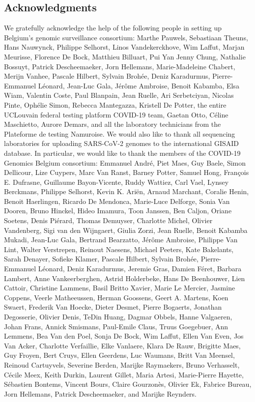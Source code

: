 \subsection*{Acknowledgments}
We gratefully acknowledge the help of the following people in setting up Belgium's genomic surveillance consortium: Marthe Pauwels, Sebastiaan Theuns, Hans Nauwynck, Philippe Selhorst, Linos Vandekerckhove, Wim Laffut, Marjan Meurisse, Florence De Bock, Matthieu Billuart, Pui Yan Jenny Chung, Nathalie Bossuyt, Patrick Descheemaeker, Jorn Hellemans, Marie-Madeleine Chabert, Merijn Vanhee, Pascale Hilbert, Sylvain Broh\'{e}e, Deniz Karadurmus, Pierre-Emmanuel L\'{e}onard, Jean-Luc Gala, J\'{e}r\^{o}me Ambroise, Benoit Kabamba, Elsa Wiam, Valentin Coste, Paul Blanpain, Jean Ruelle, Ari Serbetciyan, Nicolas Pinte, Oph\'{e}lie Simon, Rebecca Mantegazza, Kristell De Potter, the entire UCLouvain federal testing platform COVID-19 team, Gaetan Otto, C\'{e}line Maschietto, Aurore Demars, and all the laboratory technicians from the Plateforme de testing Namuroise.
We would also like to thank all sequencing laboratories for uploading SARS-CoV-2 genomes to the international GISAID database.
In particular, we would like to thank the members of the COVID-19 Genomics Belgium consortium: Emmanuel Andr\'{e}, Piet Maes, Guy Baele, Simon Dellicour, Lize Cuypers, Marc Van Ranst, Barney Potter, Samuel Hong, Fran\c{c}ois E. Dufrasne, Guillaume Bayon-Vicente, Ruddy Wattiez, Carl Vael, Lynsey Berckmans, Philippe Selhorst, Kevin K. Ari\"{e}n, Arnaud Marchant, Coralie Henin, Benoit Haerlingen, Ricardo De Mendonca, Marie-Luce Delforge, Sonia Van Dooren, Bruno Hinckel, Hideo Imamura, Toon Janssen, Ben Caljon, Oriane Soetens, Denis Pi\'{e}rard, Thomas Demuyser, Charlotte Michel, Olivier Vandenberg, Sigi van den Wijngaert, Giulia Zorzi, Jean Ruelle, Benoit Kabamba Mukadi, Jean-Luc Gala, Bertrand Bearzatto, J\'{e}r\^{o}me Ambroise, Philippe Van Lint, Walter Verstrepen, Reinout Naesens, Michael Peeters, Kate Bakelants, Sarah Denayer, Sofieke Klamer, Pascale Hilbert, Sylvain Broh\'{e}e, Pierre-Emmanuel L\'{e}onard, Deniz Karadurmus, Jeremie Gras, Damien F\'{e}ret, Barbara Lambert, Anne Vankeerberghen, Astrid Holderbeke, Hans De Beenhouwer, Lien Cattoir, Christine Lammens, Basil Britto Xavier, Marie Le Mercier, Jasmine Coppens, Veerle Matheeussen, Herman Goossens, Geert A. Martens, Koen Swaert, Frederik Van Hoecke, Dieter Desmet, Pierre Bogaerts, Jonathan Degosserie, Olivier Denis, TeDin Huang, Dagmar Obbels, Hanne Valgaeren, Johan Frans, Annick Smismans, Paul-Emile Claus, Truus Goegebuer, Ann Lemmens, Bea Van den Poel, Sonja De Bock, Wim Laffut, Ellen Van Even, Jos Van Acker, Charlotte Verfaillie, Elke Vanlaere, Klara De Rauw, Brigitte Maes, Guy Froyen, Bert Cruys, Ellen Geerdens, Luc Waumans, Britt Van Meensel, Reinoud Cartuyvels, Severine Berden, Marijke Raymaekers, Bruno Verhasselt, C\'{e}cile Meex, Keith Durkin, Laurent Gillet, Maria Artesi, Marie-Pierre Hayette, S\'{e}bastien Bontems, Vincent Bours, Claire Gourzonès, Olivier Ek, Fabrice Bureau, Jorn Hellemans, Patrick Descheemaeker, and Marijke Reynders.

